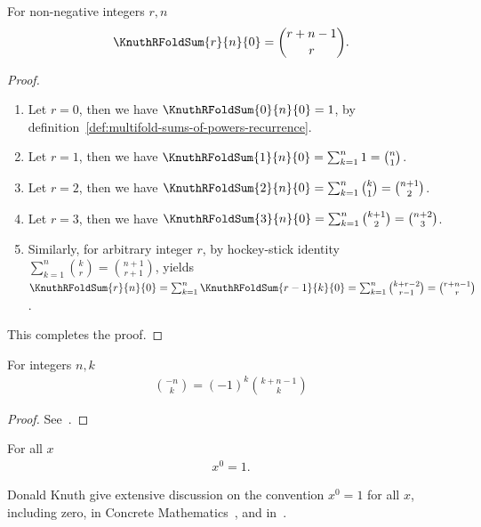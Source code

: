 \begin{lemma}
  \label{lem:multifold-sum-of-zero-powers}
  For non-negative integers $r,n$
  \begin{align*}
    \KnuthRFoldSum{r}{n}{0} = \binom{r+n-1}{r}.
  \end{align*}
  \begin{proof}
    \leavevmode\par
    \begin{enumerate}
      \item Let $r=0$, then we have $\KnuthRFoldSum{0}{n}{0} = 1$,
        by definition~\eqref{def:multifold-sums-of-powers-recurrence}.
      \item Let $r=1$, then we have
        $\KnuthRFoldSum{1}{n}{0}
        = \sum_{k=1}^{n} 1 = \binom{n}{1}$.
      \item Let $r=2$, then we have
        $\KnuthRFoldSum{2}{n}{0}
        = \sum_{k=1}^{n} \binom{k}{1}
        = \binom{n+1}{2}$.
      \item Let $r=3$, then we have
        $\KnuthRFoldSum{3}{n}{0}
        = \sum_{k=1}^{n} \binom{k+1}{2}
        = \binom{n+2}{3}$.
      \item Similarly, for arbitrary integer $r$, by hockey-stick identity
        $\sum_{k=1}^{n} \binom{k}{r} = \binom{n+1}{r+1}$,
        yields
        $\KnuthRFoldSum{r}{n}{0}
        =  \sum_{k=1}^{n} \KnuthRFoldSum{r-1}{k}{0}
        =  \sum_{k=1}^{n} \binom{k+r-2}{r-1}
        = \binom{r+n-1}{r}$.
    \end{enumerate}
    This completes the proof.
  \end{proof}
\end{lemma}

\begin{lemma}
  \label{lem:upper-binomial-negation}
  For integers $n,k$
  \begin{align*}
    \binom{-n}{k} = (-1)^{k} \binom{k+n-1}{k}
  \end{align*}
  \begin{proof}
    See~\cite[p. 164, eq. (5.14)]{graham1994concrete}.
  \end{proof}
\end{lemma}

\begin{convention} For all $x$
  \begin{align*}
    x^0 = 1.
  \end{align*}
\end{convention}
Donald Knuth give extensive discussion on the convention $x^0=1$ for
all $x$, including zero, in Concrete Mathematics~\cite[~p. 162]{graham1994concrete},
and in~\cite{knuth1992notesnotation}.
